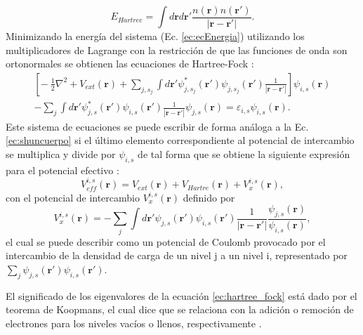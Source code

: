   \begin{equation}
  E_{Hartree} = \int d \pmb{r} d \pmb{r'} \frac{n(\pmb{r}) n(\pmb{r'})}{|\pmb{r}-\pmb{r'}|} \label{ec:Hartree}.
  \end{equation}
  \newline
  Minimizando la energ\'ia del sistema (Ec. \ref{ec:ecEnergia}) utilizando los multiplicadores de Lagrange con la  restricci\'on de que las funciones de onda son ortonormales se obtienen las ecuaciones de Hartree-Fock \cite{Jo-Ko2006}:
  \begin{multline}
  \left[ -~\frac{1}{2} \nabla^2+ V_{ext} (\pmb{r})+ \sum_{j,s_j} \int d \pmb{r'} \psi_{j,s_j}^* (\pmb{r'}) \psi_{j,s_j} (\pmb{r'}) \frac{1}{|\pmb{r} - \pmb{r'}|}  \right] \psi_{i,s} (\pmb{r}) \\
  - \sum_{j} \int d \pmb{r'} \psi_{j,s}^* (\pmb{r'}) \psi_{i,s} (\pmb{r'}) \frac{1}{|\pmb{r} - \pmb{r'}|} \psi_{j,s} (\pmb{r}) = \varepsilon_{i,s} \psi_{i,s} (\pmb{r}). \label{ec:hartree_fock}
  \end{multline} 
  Este sistema de  ecuaciones se puede  escribir de forma an\'aloga a la Ec. \ref{ec:shuncuerpo} si el \'ultimo elemento correspondiente al potencial de intercambio se multiplica y divide por $\psi_{i,s }$ de tal forma que se obtiene la siguiente expresi\'on para el potencial efectivo  \cite{Martin-2004}:
  \begin{equation}
  V_{eff}^{i,s}(\pmb{r}) =V_{ext}(\pmb{r})+ V_{Hartre} (\pmb{r}) + V_{x}^{i,s} (\pmb{r}) \label{ec:poteff},
  \end{equation}
  con el potencial de intercambio $ V_{x}^{i,s} (\pmb{r}) $ definido por \cite{Martin-2004}
  \begin{equation}
  V_{x}^{i,s} (\pmb{r}) = - \sum_{j} \int d \pmb{r'} \psi_{j,s} (\pmb{r'}) \psi_{i,s} (\pmb{r'}) \frac{1}{|\pmb{r}- \pmb{r'}|} \frac{\psi_{j,s} (\pmb{r})}{\psi_{i,s} (\pmb{r})}, \label{ec:vx}
  \end{equation}
  el cual se puede describir como un potencial  de Coulomb provocado por el intercambio de la densidad de carga de un nivel j a un nivel i, representado por $ \sum_{j} \psi_{j,s} (\pmb{r'}) \psi_{i,s} (\pmb{r'}) $.
  \newline
  \par El significado de los eigenvalores de la ecuaci\'on \ref{ec:hartree_fock} est\'a dado por el teorema de Koopmans, el cual dice que se relaciona con la adici\'on o remoci\'on  de electrones para los niveles vac\'ios o llenos, respectivamente \cite{MB-2015,Koopmn-1934}.
  \newline %
